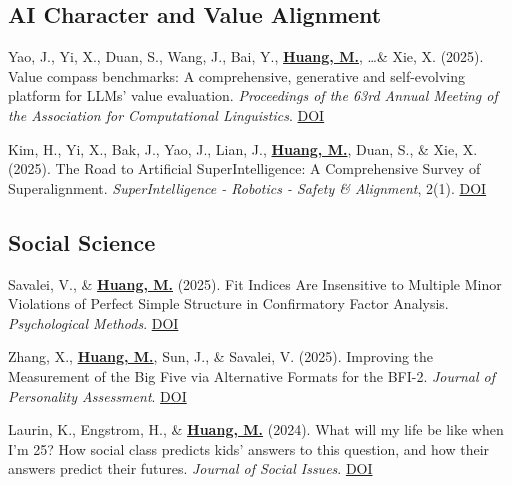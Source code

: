 \documentclass[11pt,letterpaper]{article}
\newcommand{\myname}[1]{\textbf{\uline{#1}}}
\begin{document}
\subsection*{AI Character and Value Alignment}
\begin{enumerate}[label={[\arabic*]}]
    \item Yao, J., Yi, X., Duan, S., Wang, J., Bai, Y., \myname{Huang, M.}, \ldots \& Xie, X. (2025). Value compass benchmarks: A comprehensive, generative and self-evolving platform for LLMs' value evaluation. \textit{Proceedings of the 63rd Annual Meeting of the Association for Computational Linguistics}. \href{https://doi.org/10.18653/v1/2025.acl-demo.64}{DOI}
    \item Kim, H., Yi, X., Bak, J., Yao, J., Lian, J., \myname{Huang, M.}, Duan, S., \& Xie, X. (2025). The Road to Artificial SuperIntelligence: A Comprehensive Survey of Superalignment. \textit{SuperIntelligence - Robotics - Safety \& Alignment}, 2(1). \href{https://doi.org/10.70777/si.v2i1.13963}{DOI}
\end{enumerate}

\subsection*{Social Science}
\begin{enumerate}[label={[\arabic*]}]
    \item Savalei, V., \& \myname{Huang, M.} (2025). Fit Indices Are Insensitive to Multiple Minor Violations of Perfect Simple Structure in Confirmatory Factor Analysis. \textit{Psychological Methods}. \href{https://dx.doi.org/10.1037/met0000718}{DOI}
    \item Zhang, X., \myname{Huang, M.}, Sun, J., \& Savalei, V. (2025). Improving the Measurement of the Big Five via Alternative Formats for the BFI-2. \textit{Journal of Personality Assessment}. \href{https://doi.org/10.1080/00223891.2025.2531187}{DOI}
    \item Laurin, K., Engstrom, H., \& \myname{Huang, M.} (2024). What will my life be like when I'm 25? How social class predicts kids' answers to this question, and how their answers predict their futures. \textit{Journal of Social Issues}. \href{https://doi.org/10.1111/josi.12650}{DOI}
\end{enumerate}

\end{document}
